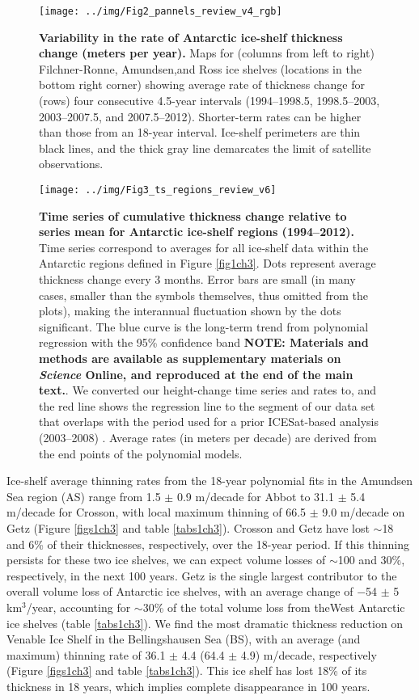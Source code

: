 \begin{figure}[!ht]
  \texttt{[image: ../img/Fig2\_pannels\_review\_v4\_rgb]}
  \caption{{\bf Variability in the rate of Antarctic ice-shelf thickness change
  (meters per year).} Maps for (columns from left to right) Filchner-Ronne,
  Amundsen,and Ross ice shelves (locations in the bottom right corner) showing
  average rate of thickness change for (rows) four consecutive 4.5-year
  intervals (1994--1998.5, 1998.5--2003, 2003--2007.5, and 2007.5--2012).
  Shorter-term rates can be higher than those from an 18-year interval.
  Ice-shelf perimeters are thin black lines, and the thick gray line demarcates
  the limit of satellite observations.}
  \label{fig2ch3}
\end{figure}


\begin{SCfigure}[.6][!ht]
  \texttt{[image: ../img/Fig3\_ts\_regions\_review\_v6]}
  \caption{{\bf Time series of cumulative thickness change relative to series
  mean for Antarctic ice-shelf regions (1994--2012).} Time series correspond to
  averages for all ice-shelf data within the Antarctic regions defined in
  Figure \ref{fig1ch3}. Dots represent average thickness change every 3 months. Error
  bars are small (in many cases, smaller than the symbols themselves, thus
  omitted from the plots), making the interannual fluctuation shown by the dots
  significant. The blue curve is the long-term trend from polynomial regression
  with the 95\% confidence band {\bf NOTE: Materials and methods are available as 
  supplementary materials on {\it Science} Online, and reproduced at the end of
  the main text.}. We converted our height-change time series and rates to, and
  the red line shows the regression line to the segment of our data set that
  overlaps with the period used for a prior ICESat-based analysis (2003--2008)
  \parencite{Pritchard2012}. Average rates (in meters per decade) are derived
  from the end points of the polynomial models.}
  \label{fig3ch3}
\end{SCfigure}


Ice-shelf average thinning rates from the 18-year polynomial fits in the
Amundsen Sea region (AS) range from 1.5 $\pm$ 0.9 m/decade for Abbot to 
31.1 $\pm$ 5.4 m/decade for Crosson, with local maximum thinning of 
66.5 $\pm$ 9.0 m/decade on Getz (Figure \ref{figs1ch3} and table
\ref{tabs1ch3}). Crosson and Getz have lost $\sim$18 and 6\% of their
thicknesses, respectively, over the 18-year period. If this thinning persists
for these two ice shelves, we can expect volume losses of $\sim$100 and 30\%,
respectively, in the next 100 years. Getz is the single largest contributor to
the overall volume loss of Antarctic ice shelves, with an average change of 
$-$54 $\pm$ 5 km$^3$/year, accounting for $\sim$30\% of the total volume loss
from theWest Antarctic ice shelves (table \ref{tabs1ch3}). We find the most
dramatic thickness reduction on Venable Ice Shelf in the Bellingshausen Sea
(BS), with an average (and maximum) thinning rate of 36.1 $\pm$ 4.4
(64.4 $\pm$ 4.9) m/decade, respectively (Figure \ref{figs1ch3} and table
\ref{tabs1ch3}). This ice shelf has lost 18\% of its thickness in 18 years,
which implies complete disappearance in 100 years.

